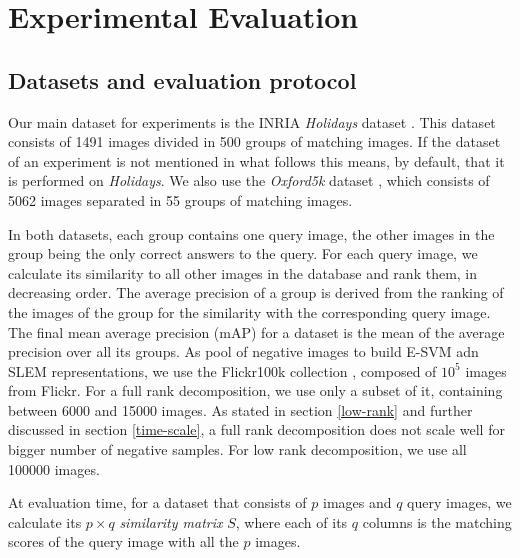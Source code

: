 \section{Experimental Evaluation}
\label{eval}

\subsection{Datasets and evaluation protocol} \label{eval:protocol}
Our main dataset for experiments is the INRIA \emph{Holidays} dataset \cite{holidays}. This dataset consists of 1491 images divided in 500 groups of matching images. If the dataset of an experiment is not mentioned in what follows this means, by default, that it is performed on \emph{Holidays}.
We also use  the \emph{Oxford5k} dataset \cite{oxford}, which consists of 5062 images separated in 55 groups of matching images.

In both datasets, each group contains one query image, the other images in the group being the only correct answers to the query. 
For each query image, we calculate its similarity to all other images in the database and rank them, in decreasing order. 
The average precision of a group is derived from the ranking of the images of the group for the similarity with the corresponding query image. 
The final mean average precision (mAP) for a dataset is the mean of the average precision over all its groups.
As pool of negative images to build E-SVM adn SLEM representations, we use the Flickr100k collection \cite{oxford}, composed of $10^5$ images from Flickr. For a full rank decomposition, we use only a subset of it, containing between 6000 and 15000 images. 
As stated in section \ref{low-rank} and further discussed in section \ref{time-scale}, a full rank decomposition does not scale well for bigger number of negative samples. For low rank decomposition, we use all 100000 images.

At evaluation time, for a dataset that consists of $p$ images and $q$ query images, we calculate its $p\times q$ \emph{similarity matrix} $S$, where each of its $q$ columns is the matching scores of the query image with all the $p$ images.


